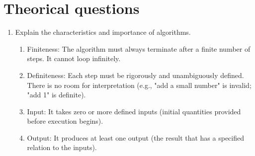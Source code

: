 \documentclass[11pt, a4paper]{article}
\begin{document}
\section{Theorical questions}
\begin{enumerate}
  \item Explain the characteristics and importance of algorithms.\\
  \begin{enumerate}
  \item Finiteness: The algorithm must always terminate after a finite number of steps. It cannot loop infinitely.

\item Definiteness: Each step must be rigorously and unambiguously defined. There is no room for interpretation (e.g., "add a small number" is invalid; "add 1" is definite).

\item Input: It takes zero or more defined inputs (initial quantities provided before execution begins).

\item Output: It produces at least one output (the result that has a specified relation to the inputs).


\end{enumerate}
\end{enumerate}
\end{document}
